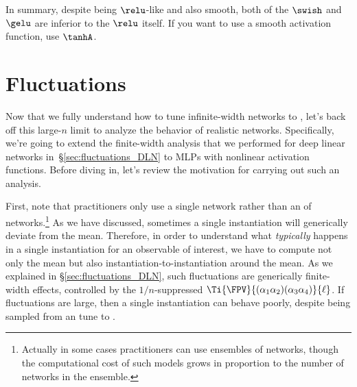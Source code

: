 In summary, despite being $\relu$-like and also smooth, both of the $\swish$ and $\gelu$ are inferior to the $\relu$ itself. If you want to use a smooth activation function, use $\tanhA$.









\section{Fluctuations}\label{sec:signal_prop_finite_width}



Now that we fully understand how to tune infinite-width networks
to , let's back off this large-$n$ limit to analyze the behavior of realistic networks. Specifically, we're going to extend the finite-width analysis that we performed for deep linear networks in~\S\ref{sec:fluctuations_DLN} to MLPs with nonlinear activation functions.
Before diving in, let's review the motivation for carrying out such an analysis. %


First, note that practitioners only use a single network rather than an  of networks.\footnote{Actually in some cases practitioners can use ensembles of networks, though the computational cost of such models grows in proportion to the number of networks in the ensemble.} 
As we have discussed, sometimes a single instantiation will generically deviate from the mean.
Therefore, in order to understand what \emph{typically} happens in a single instantiation for an observable of interest, we have to compute not only the mean but also instantiation-to-instantiation  around the mean. As we explained in \S\ref{sec:fluctuations_DLN}, such fluctuations are generically finite-width effects, controlled by the $1/n$-suppressed  $\Ti{\FPV}{(\alpha_1\alpha_2)(\alpha_3\alpha_4)}{\ell}$.
If fluctuations are large, then a single instantiation can behave poorly, despite being sampled from an  tune to .


